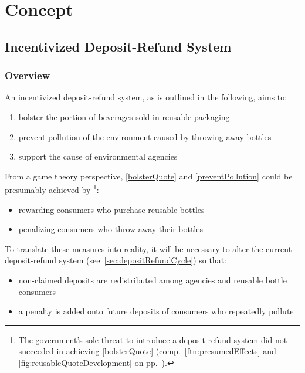 
\chapter{Concept}
\label{chp:concept}

\section{Incentivized Deposit-Refund System}
\label{sec:incentivizedSystem}

\subsection{Overview}
\label{sec:incentivizedOverview}
An incentivized deposit-refund system, as is outlined in the following, aims to:

\begin{enumerate}[label=(\Alph*)]
  \item \label{bolsterQuote} bolster the portion of beverages sold in reusable packaging
  \item \label{preventPollution} prevent pollution of the environment caused by throwing away bottles
  \item support the cause of environmental agencies
\end{enumerate}

From a game theory perspective, \ref{bolsterQuote} and \ref{preventPollution} could be presumably achieved by \footnote{The government's sole threat to introduce a deposit-refund system did not succeeded in achieving \ref{bolsterQuote} (comp.~\autoref{ftn:presumedEffects} and \autoref{fig:reusableQuoteDevelopment} on pp.~).}:

\begin{itemize}
  \item rewarding consumers who purchase reusable bottles
  \item penalizing consumers who throw away their bottles
\end{itemize}

To translate these measures into reality, it will be necessary to alter the current deposit-refund system (see~\ref{sec:depositRefundCycle}) so that:

\begin{itemize}
  \item non-claimed deposits are redistributed among agencies and reusable bottle consumers
  \item a penalty is added onto future deposits of consumers who repeatedly pollute
\end{itemize}

